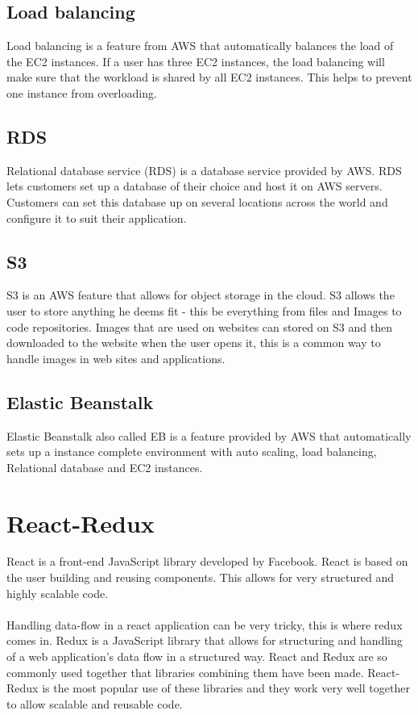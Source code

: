 \subsection{Load balancing}
Load balancing is a feature from AWS that automatically balances the load of the EC2 instances. If a user has three EC2 instances, the load balancing will make sure that the workload is shared by all EC2 instances. This helps to prevent one instance from overloading. \cite{AWSDoc}
\subsection{RDS}
Relational database service (RDS) is a database service provided by AWS. RDS lets customers set up a database of their choice and host it on AWS servers. Customers can set this database up on several locations across the world and configure it to suit their application. \cite{AWSDoc}
\subsection{S3}
S3 is an AWS feature that allows for object storage in the cloud. S3 allows the user to store anything he deems fit - this be everything from files and Images to code repositories. Images that are used on websites can stored on S3 and then downloaded to the website when the user opens it, this is a common way to handle images in web sites and applications. \cite{AWSDoc}
\subsection{Elastic Beanstalk}
Elastic Beanstalk also called EB is a feature provided by AWS that automatically sets up a instance complete environment with auto scaling, load balancing, Relational database and EC2 instances. \cite{AWSDoc}
\section{React-Redux}
React is a front-end JavaScript library developed by Facebook. React is based on the user building and reusing components. This allows for very structured and highly scalable code.
\\\\
Handling data-flow in a react application can be very tricky, this is where redux comes in. Redux is a JavaScript library that allows for structuring and handling of a web application's data flow in a structured way. React and Redux are so commonly used together that libraries combining them have been made. React-Redux is the most popular use of these libraries and they work very well together to allow scalable and reusable code.  \cite{react} \cite{redux}
